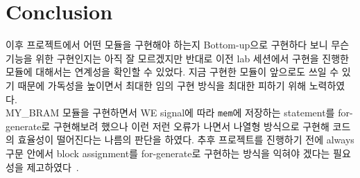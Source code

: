\documentclass{article}
\begin{document}
\newpage
\section{Conclusion}

이후 프로젝트에서 어떤 모듈을 구현해야 하는지 Bottom-up으로 구현하다 보니 무슨 기능을 위한 구현인지는 아직 잘 모르겠지만 반대로 이전 lab 세션에서 구현을 진행한 모듈에 대해서는 연계성을 확인할 수 있었다. 지금 구현한 모듈이 앞으로도 쓰일 수 있기 때문에 가독성을 높이면서 최대한 임의 구현 방식을 최대한 피하기 위해 노력하였다. \\

MY\_BRAM 모듈을 구현하면서 WE signal에 따라 \texttt{mem}에 저장하는 statement를 for-generate로 구현해보려 했으나 이런 저런 오류가 나면서 나열형 방식으로 구현해 코드의 효율성이 떨어진다는 나름의 판단을 하였다. 추후 프로젝트를 진행하기 전에 always 구문 안에서 block assignment를 for-generate로 구현하는 방식을 익혀야 겠다는 필요성을 제고하였다~\cite{thomas2008verilog}.



\end{document}
